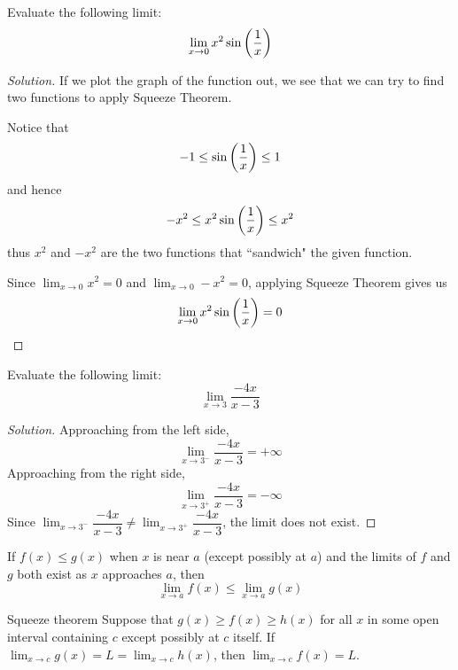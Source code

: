 \begin{exmp}{}{}
Evaluate the following limit:
\[ \lim_{x\to 0} x^2\sin\left(\frac{1}{x}\right) \]
\end{exmp}

\begin{proof}[Solution]
If we plot the graph of the function out, we see that we can try to find two functions to apply Squeeze Theorem.

Notice that \[ -1 \le \sin\left(\frac{1}{x}\right) \le 1 \]
and hence
\[ -x^2 \le x^2\sin\left(\frac{1}{x}\right) \le x^2 \]
thus $x^2$ and $-x^2$ are the two functions that ``sandwich" the given function.

Since $\lim_{x\to 0}x^2=0$ and $\lim_{x\to 0}-x^2=0$, applying Squeeze Theorem gives us 
\[ \lim_{x\to 0} x^2\sin\left(\frac{1}{x}\right) = 0 \]
\end{proof}

\begin{exmp}{}{}
Evaluate the following limit:
\[ \lim_{x\to 3}\frac{-4x}{x-3} \]
\end{exmp}

\begin{proof}[Solution]
Approaching from the left side,
\[ \lim_{x\to 3^-}\frac{-4x}{x-3} = +\infty \]
Approaching from the right side,
\[ \lim_{x\to 3^+}\frac{-4x}{x-3} = -\infty \]
Since $\lim_{x\to 3^-}\dfrac{-4x}{x-3} \neq \lim_{x\to 3^+}\dfrac{-4x}{x-3}$, the limit does not exist.
\end{proof}

\begin{thrm}{}{}
If $f(x) \le g(x)$ when $x$ is near $a$ (except possibly at $a$) and the limits of $f$ and $g$ both exist as $x$ approaches $a$, then
\[ \lim_{x\to a}f(x) \le \lim_{x\to a}g(x) \]
\end{thrm}

\begin{thrm}{Squeeze theorem}{}
Suppose that $g(x) \ge f(x) \ge h(x)$ for all $x$ in some open interval containing $c$ except possibly at $c$ itself. If $\lim_{x\to c} g(x) = L = \lim_{x\to c} h(x)$, then $\lim_{x\to c} f(x) = L$.
\end{thrm}

